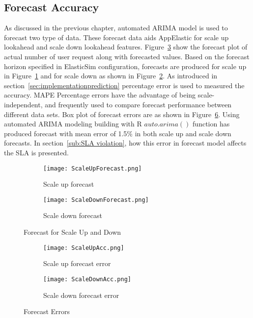 \subsection{Forecast Accuracy}
\label{sub:Forecast Accuracy}
As discussed in the previous chapter, automated ARIMA model is used to forecast two type of data. These forecast data aids AppElastic for scale up lookahead and scale down lookahead features. Figure~\ref{fig:forecast} show the forecast plot of actual number of user request along with forecasted values. Based on the forecast horizon specified in ElasticSim configuration, forecasts are produced for scale up in Figure~\ref{figure:forecastscaleup} and for scale down as shown in Figure~\ref{figure:forecastscaledown}. As introduced in section~\ref{sec:implementationprediction} percentage error is used to measured the accuracy. MAPE Percentage errors have the advantage of being scale-independent, and frequently used to compare forecast performance between different data sets. Box plot of forecast errors are as shown in Figure~\ref{fig:forecasterror}. Using automated ARIMA modeling building with R \(auto.arima()\) function has produced forecast with mean error of 1.5\% in both scale up and scale down forecasts. In section~\ref{sub:SLA violation}, how this error in forecast model affects the SLA is presented.
\begin{figure}
     \centering
     \begin{subfigure}[b]{0.9\textwidth}
         \texttt{[image: ScaleUpForecast.png]}
         \caption{Scale up forecast}
         \label{figure:forecastscaleup}
     \end{subfigure}
     \begin{subfigure}[b]{0.9\textwidth}
         \texttt{[image: ScaleDownForecast.png]}
         \caption{Scale down forecast}
         \label{figure:forecastscaledown}
     \end{subfigure}
     \caption{Forecast for Scale Up and Down}
     \label{fig:forecast}
\end{figure}
\begin{figure}
     \centering
     \begin{subfigure}[b]{0.45\textwidth}
         \texttt{[image: ScaleUpAcc.png]}
         \caption{Scale up forecast error}
         \label{figure:forecastscaleuperror}
     \end{subfigure}
     \hfill
     \begin{subfigure}[b]{0.45\textwidth}
         \texttt{[image: ScaleDownAcc.png]}
         \caption{Scale down forecast error}
         \label{figure:forecastscaledownerror}
     \end{subfigure}
     \caption{Forecast Errors}
     \label{fig:forecasterror}
\end{figure}
